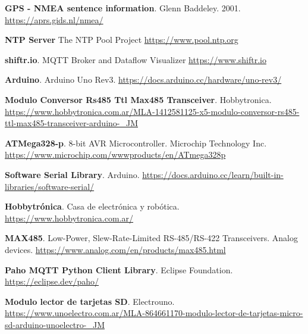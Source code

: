 \begin{thebibliography}{30}
\textbf{GPS - NMEA sentence information}. Glenn Baddeley. 2001.
\href{https://aprs.gids.nl/nmea/}{https://aprs.gids.nl/nmea/}

\textbf{NTP Server} The NTP Pool Project
\href{https://www.pool.ntp.org}{https://www.pool.ntp.org}


\textbf{shiftr.io}. MQTT Broker and Dataflow Visualizer
\href{https://www.shiftr.io}{https://www.shiftr.io}

\textbf{Arduino}. Arduino Uno Rev3.
\href{https://docs.arduino.cc/hardware/uno-rev3/}{https://docs.arduino.cc/hardware/uno-rev3/}

\textbf{Modulo Conversor Rs485 Ttl Max485 Transceiver}. Hobbytronica. 
\href{https://www.hobbytronica.com.ar/MLA-1412581125-x5-modulo-conversor-rs485-ttl-max485-transceiver-arduino-_JM}{https://www.hobbytronica.com.ar/MLA-1412581125-x5-modulo-conversor-rs485-ttl-max485-transceiver-arduino-\_JM}

\textbf{ATMega328-p}. 8-bit AVR Microcontroller. Microchip Technology Inc. 
\href{https://www.microchip.com/wwwproducts/en/ATmega328p}{https://www.microchip.com/wwwproducts/en/ATmega328p}

\textbf{Software Serial Library}. Arduino. 
\href{https://docs.arduino.cc/learn/built-in-libraries/software-serial/}{https://docs.arduino.cc/learn/built-in-libraries/software-serial/}


\textbf{Hobbytrónica}. Casa de electrónica y robótica. 
\href{https://docs.arduino.cc/learn/built-in-libraries/software-serial/}{https://www.hobbytronica.com.ar/}

\textbf{MAX485}. Low-Power, Slew-Rate-Limited RS-485/RS-422 Transceivers. Analog devices.
\href{https://www.analog.com/en/products/max485.html}{https://www.analog.com/en/products/max485.html}

\textbf{Paho MQTT Python Client Library}. Eclipse Foundation. 
\href{https://eclipse.dev/paho/}{https://eclipse.dev/paho/}


\textbf{Modulo lector de tarjetas SD}. Electrouno. 
\href{https://www.unoelectro.com.ar/MLA-864661170-modulo-lector-de-tarjetas-micro-sd-arduino-unoelectro-_JM}{https://www.unoelectro.com.ar/MLA-864661170-modulo-lector-de-tarjetas-micro-sd-arduino-unoelectro-\_JM}




 \end{thebibliography}